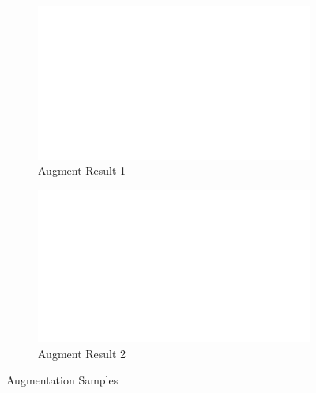 \documentclass[11pt,a4paper]{article}
\begin{document}
\begin{figure}[h]
	\centering
	\begin{subfigure}[b]{0.4\textwidth}
		\centering
		\def\svgwidth{\columnwidth}
		\includegraphics[width=1\textwidth]{Figure/ifitera-header.png}
		\caption{Augment Result 1}
		\label{fig:aug-1}
	\end{subfigure}
	\qquad %
	\begin{subfigure}[b]{0.4\textwidth}
		\centering
		\def\svgwidth{\columnwidth}
		\includegraphics[width=1\textwidth]{Figure/ifitera-header.png}
		\caption{Augment Result 2}
		\label{fig:aug-2}
	\end{subfigure}
	\caption{Augmentation Samples}\label{fig:aug}
\end{figure}


\newpage
\end{document}
